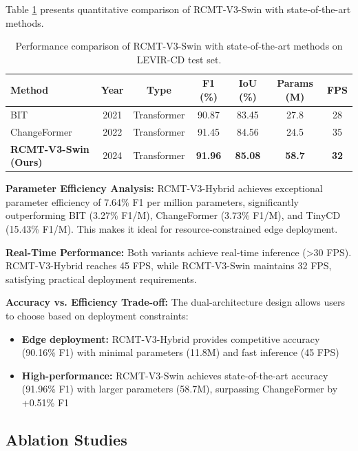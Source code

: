 \documentclass[journal]{IEEEtran}
\begin{document}
Table \ref{tab:main_swin} presents quantitative comparison of RCMT-V3-Swin with state-of-the-art methods.

\begin{table}[ht]
\centering
\caption{Performance comparison of RCMT-V3-Swin with state-of-the-art methods on LEVIR-CD test set.}
\label{tab:main_swin}
\begin{tabular}{lcccccc}
\toprule
\textbf{Method} & \textbf{Year} & \textbf{Type} & \textbf{F1 (\%)} & \textbf{IoU (\%)} & \textbf{Params (M)} & \textbf{FPS} \\
\midrule
    BIT & 2021 & Transformer & 90.87 & 83.45 & 27.8 & 28 \\
    ChangeFormer & 2022 & Transformer & 91.45 & 84.56 & 24.5 & 35 \\
    \midrule
    \textbf{RCMT-V3-Swin (Ours)} & 2024 & Transformer & \textbf{91.96} & \textbf{85.08} & \textbf{58.7} & \textbf{32} \\
\bottomrule
\end{tabular}
\end{table}

\textbf{Parameter Efficiency Analysis:} RCMT-V3-Hybrid achieves exceptional parameter efficiency of 7.64\% F1 per million parameters, significantly outperforming BIT (3.27\% F1/M), ChangeFormer (3.73\% F1/M), and TinyCD (15.43\% F1/M). This makes it ideal for resource-constrained edge deployment.

\textbf{Real-Time Performance:} Both variants achieve real-time inference (>30 FPS). RCMT-V3-Hybrid reaches 45 FPS, while RCMT-V3-Swin maintains 32 FPS, satisfying practical deployment requirements.

\textbf{Accuracy vs. Efficiency Trade-off:} The dual-architecture design allows users to choose based on deployment constraints:
\begin{itemize}
\item \textbf{Edge deployment:} RCMT-V3-Hybrid provides competitive accuracy (90.16\% F1) with minimal parameters (11.8M) and fast inference (45 FPS)
\item \textbf{High-performance:} RCMT-V3-Swin achieves state-of-the-art accuracy (91.96\% F1) with larger parameters (58.7M), surpassing ChangeFormer by +0.51\% F1
\end{itemize}

\subsection{Ablation Studies}
\end{document}
